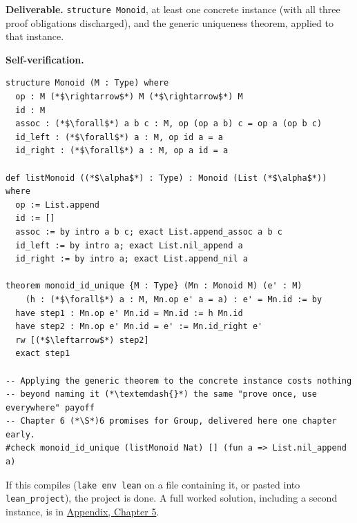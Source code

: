 \begin{pblproject}
\textbf{Deliverable.} \texttt{structure Monoid}, at least one concrete instance (with all three proof obligations discharged), and the generic uniqueness theorem, applied to that instance.

\textbf{Self-verification.}

\begin{lstlisting}
structure Monoid (M : Type) where
  op : M (*$\rightarrow$*) M (*$\rightarrow$*) M
  id : M
  assoc : (*$\forall$*) a b c : M, op (op a b) c = op a (op b c)
  id_left : (*$\forall$*) a : M, op id a = a
  id_right : (*$\forall$*) a : M, op a id = a

def listMonoid ((*$\alpha$*) : Type) : Monoid (List (*$\alpha$*)) where
  op := List.append
  id := []
  assoc := by intro a b c; exact List.append_assoc a b c
  id_left := by intro a; exact List.nil_append a
  id_right := by intro a; exact List.append_nil a

theorem monoid_id_unique {M : Type} (Mn : Monoid M) (e' : M)
    (h : (*$\forall$*) a : M, Mn.op e' a = a) : e' = Mn.id := by
  have step1 : Mn.op e' Mn.id = Mn.id := h Mn.id
  have step2 : Mn.op e' Mn.id = e' := Mn.id_right e'
  rw [(*$\leftarrow$*) step2]
  exact step1

-- Applying the generic theorem to the concrete instance costs nothing
-- beyond naming it (*\textemdash{}*) the same "prove once, use everywhere" payoff
-- Chapter 6 (*\S*)6 promises for Group, delivered here one chapter early.
#check monoid_id_unique (listMonoid Nat) [] (fun a => List.nil_append a)
\end{lstlisting}

If this compiles (\texttt{lake env lean} on a file containing it, or pasted into \texttt{lean\_\allowbreak{}project}), the project is done. A full worked solution, including a second instance, is in \hyperref[sec:14-appendix-solutions:04-chapter-5:1]{Appendix, Chapter 5}.

\end{pblproject}
